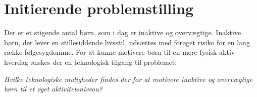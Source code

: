 \section{Initierende problemstilling}
%
Der er et stigende antal børn, som i dag er inaktive og overvægtige. Inaktive børn, der lever en stillesiddende livsstil, udsættes med forøget risiko for en lang række følgesygdomme. For at kunne motivere børn til en mere fysisk aktiv hverdag ønskes der en teknologisk tilgang til problemet:

\begin{center}
\textit{Hvilke teknologiske muligheder findes der for at motivere inaktive og overvægtige børn til et øget aktivitetsniveau?}
\end{center}